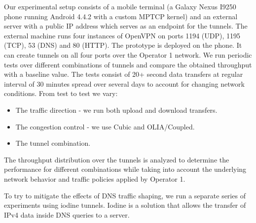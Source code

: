 Our experimental setup consists of a mobile terminal (a Galaxy Nexus I9250 phone running Android 4.4.2 with a custom MPTCP kernel) and an external server with a public IP address which serves as an endpoint for the tunnels. The external machine runs four instances of OpenVPN on ports 1194 (UDP), 1195 (TCP), 53 (DNS) and 80 (HTTP). The prototype is deployed on the phone. It can create tunnels on all four ports over the Operator 1 network. We run periodic tests over different combinations of tunnels and compare the obtained throughput with a baseline value. The tests consist of 20+ second data transfers at regular interval of 30 minutes spread over several days to account for changing network conditions. From test to test we vary:

\begin{itemize}
\item The traffic direction - we run both upload and download transfers.
\item The congestion control - we use Cubic and OLIA/Coupled.
\item The tunnel combination.
\end{itemize}

The throughput distribution over the tunnels is analyzed to determine the performance for different combinations while taking into account the underlying network behavior and traffic policies applied by Operator 1.

To try to mitigate the effects of DNS traffic shaping, we run a separate series of experiments using iodine tunnels. Iodine is a solution that allows the transfer of IPv4 data inside DNS queries to a server.